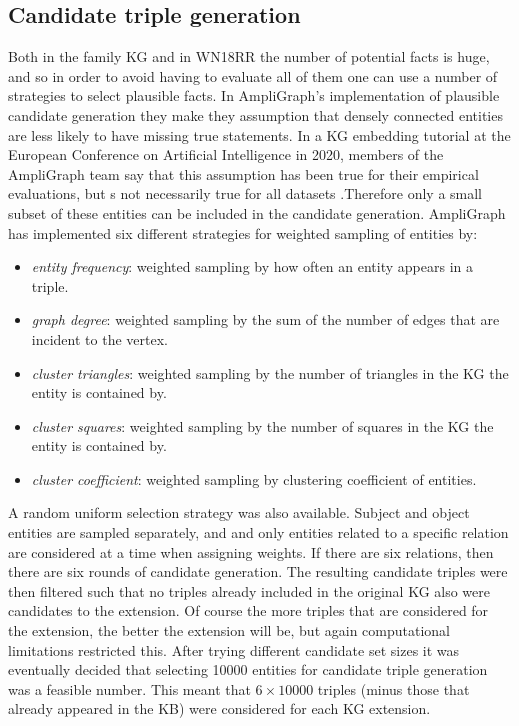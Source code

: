 \subsection{Candidate triple generation}
Both in the family KG and in WN18RR the number of potential facts is huge, and so in order to avoid having to evaluate all of them one can use a number of strategies to select plausible facts. In AmpliGraph's implementation of plausible candidate generation they make they assumption that densely connected entities are less likely to have missing true statements. In a KG embedding tutorial at the European Conference on Artificial Intelligence in 2020, members of the AmpliGraph team say that this assumption has been true for their empirical evaluations, but s not necessarily true for all datasets \cite{nicholas_ampligraph_tutorial}.Therefore only a small subset of these entities can be included in the candidate generation. AmpliGraph has implemented six different strategies for weighted sampling of entities by:
\begin{itemize}
    \item \textit{entity frequency}: weighted sampling by how often an entity appears in a triple.
    \item \textit{graph degree}: weighted sampling by the sum of the number of edges that are incident to the vertex.
    \item \textit{cluster triangles}: weighted sampling by the number of triangles in the KG the entity is contained by.
    \item \textit{cluster squares}: weighted sampling by the number of squares in the KG the entity is contained by.
    \item \textit{cluster coefficient}: weighted sampling by clustering coefficient of entities.
\end{itemize}
A random uniform selection strategy was also available. Subject and object entities are sampled separately, and and only entities related to a specific relation are considered at a time when assigning weights. If there are six relations, then there are six rounds of candidate generation. The resulting candidate triples were then filtered such that no triples already included in the original KG also were candidates to the extension. Of course the more triples that are considered for the extension, the better the extension will be, but again computational limitations restricted this. After trying different candidate set sizes it was eventually decided that selecting 10000 entities for candidate triple generation was a feasible number. This meant that $ 6 \times 10000$ triples (minus those that already appeared in the KB) were considered for each KG extension.



